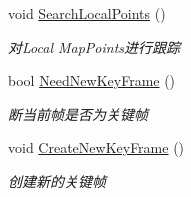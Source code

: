 \begin{DoxyCompactItemize}
void \mbox{\hyperlink{class_o_r_b___s_l_a_m2_1_1_tracking_a451c0e5372c24645c7634fcebc8fa847}{Search\+Local\+Points}} ()
\begin{DoxyCompactList}\small\item\em 对\+Local Map\+Points进行跟踪 \end{DoxyCompactList}\item 
bool \mbox{\hyperlink{class_o_r_b___s_l_a_m2_1_1_tracking_afc013c5a20bc6beb772b96a875b19216}{Need\+New\+Key\+Frame}} ()
\begin{DoxyCompactList}\small\item\em 断当前帧是否为关键帧 \end{DoxyCompactList}\item 
void \mbox{\hyperlink{class_o_r_b___s_l_a_m2_1_1_tracking_a8c7fb6c4b1f952524512023df690bf4d}{Create\+New\+Key\+Frame}} ()
\begin{DoxyCompactList}\small\item\em 创建新的关键帧 \end{DoxyCompactList}\end{DoxyCompactItemize}
